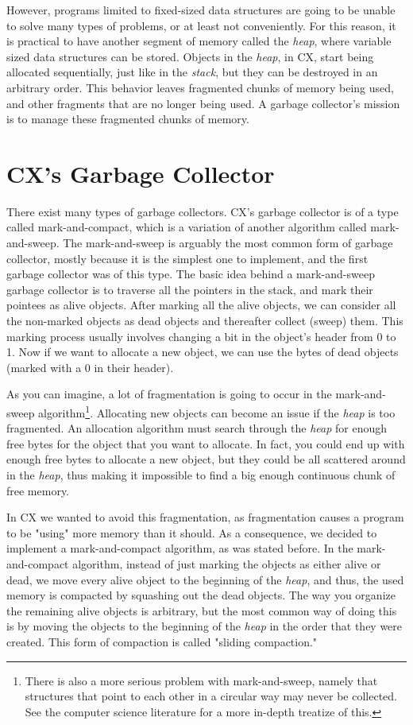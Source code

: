 \documentclass[11pt,fleqn,openany]{book} %
\begin{document}
However, programs limited to fixed-sized data structures are going to be unable to solve many types of problems, or at least not conveniently. For this reason, it is practical to have another segment of memory called the \emph{heap}, where variable sized data structures can be stored. Objects in the \emph{heap}, in CX, start being allocated sequentially, just like in the \emph{stack}, but they can be destroyed in an arbitrary order. This behavior leaves fragmented chunks of memory being used, and other fragments that are no longer being used. A garbage collector's mission is to manage these fragmented chunks of memory.

\section{CX's Garbage Collector}

There exist many types of garbage collectors. CX's garbage collector is of a type called mark-and-compact, which is a variation of another algorithm called mark-and-sweep. The mark-and-sweep is arguably the most common form of garbage collector, mostly because it is the simplest one to implement, and the first garbage collector was of this type. The basic idea behind a mark-and-sweep garbage collector is to traverse all the pointers in the stack, and mark their pointees as alive objects. After marking all the alive objects, we can consider all the non-marked objects as dead objects and thereafter collect (sweep) them. This marking process usually involves changing a bit in the object's header from 0 to 1. Now if we want to allocate a new object, we can use the bytes of dead objects (marked with a 0 in their header).

As you can imagine, a lot of fragmentation is going to occur in the mark-and-sweep algorithm\footnote{There is also a more serious problem with mark-and-sweep, namely that structures that point to each other in a circular way may never be collected. See the computer science literature for a more in-depth treatize of this.}. Allocating new objects can become an issue if the \emph{heap} is too fragmented. An allocation algorithm must search through the \emph{heap} for enough free bytes for the object that you want to allocate. In fact, you could end up with enough free bytes to allocate a new object, but they could be all scattered around in the \emph{heap}, thus making it impossible to find a big enough continuous chunk of free memory.

In CX we wanted to avoid this fragmentation, as fragmentation causes a program to be "using" more memory than it should. As a consequence, we decided to implement a mark-and-compact algorithm, as was stated before. In the mark-and-compact algorithm, instead of just marking the objects as either alive or dead, we move every alive object to the beginning of the \emph{heap}, and thus, the used memory is compacted by squashing out the dead objects. The way you organize the remaining alive objects is arbitrary, but the most common way of doing this is by moving the objects to the beginning of the \emph{heap} in the order that they were created. This form of compaction is called "sliding compaction."
\end{document}
